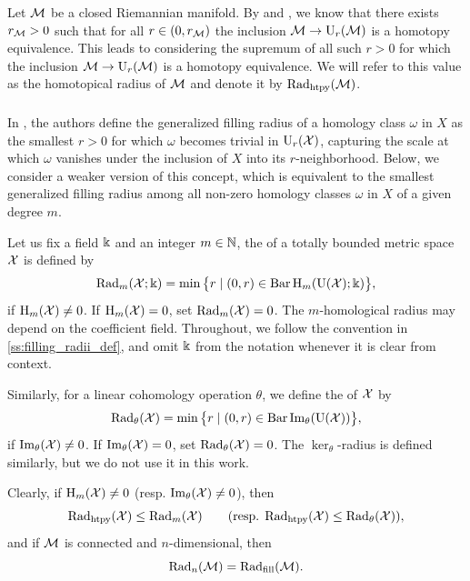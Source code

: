 Let \(\mathcal{M}\) be a closed Riemannian manifold.
By \cite[Theorem~3.5]{hausmann1995vietoris} and \cite[Theorem~4.1]{lim2024vietoris}, we know that there exists \(r_{\mathcal{M}} > 0\) such that for all \(r \in (0, r_{\mathcal{M}})\) the inclusion \(\mathcal{M} \to \mathrm{U}_{r}(\mathcal{M})\) is a homotopy equivalence.
This leads to considering the supremum of all such \(r > 0\) for which the inclusion \(\mathcal{M} \to \mathrm{U}_r(\mathcal{M})\) is a homotopy
equivalence.
We will refer to this value as the homotopical radius of $\mathcal{M}$ and denote it by \(\mathrm{Rad}_{\mathrm{htpy}}(\mathcal{M})\).

\subsubsection{} \label{ss:beta v.s. fillrad}

In \cite[Definition~9.44]{lim2024vietoris}, the authors define the generalized filling radius of a homology class \(\omega\) in \(X\) as the smallest \(r > 0\) for which \(\omega\) becomes trivial in \(\mathrm{U}_r(\mathcal{X})\), capturing the scale at which \(\omega\) vanishes under the inclusion of \(X\) into its \(r\)-neighborhood.
Below, we consider a weaker version of this concept, which is equivalent to the smallest generalized filling radius among all non-zero homology classes \(\omega\) in \(X\) of a given degree $m$.

Let us fix a field \(\Bbbk\) and an integer \(m \in \mathbb{N}\), the  of a totally bounded metric space \(\mathcal{X}\) is defined by
\[
\mathrm{Rad}_{m}(\mathcal{X}; \Bbbk) =
\min \big\{r \mid (0, r) \in \operatorname{Bar} \mathrm{H}_m(\mathrm{U}(\mathcal{X}); \Bbbk)\big\},
\]
if \(\mathrm{H}_m(\mathcal{X}) \neq 0\).
If \(\mathrm{H}_m(\mathcal{X}) = 0\), set \(\mathrm{Rad}_{m}(\mathcal{X}) = 0\).
The \(m\)-homological radius may depend on the coefficient field.
Throughout, we follow the convention in \cref{ss:filling_radii_def}, and omit \(\Bbbk\) from the notation whenever it is clear from context.

Similarly, for a linear cohomology operation \(\theta\), we define the  of \(\mathcal{X}\) by
\[
\mathrm{Rad}_{\theta}(\mathcal{X}) = \min \big\{r \mid (0, r) \in \operatorname{Bar} \operatorname{Im}_\theta(\mathrm{U}(\mathcal{X}))\big\},
\]
if \(\operatorname{Im}_\theta(\mathcal{X}) \neq 0\).
If \(\operatorname{Im}_\theta(\mathcal{X}) = 0\), set $\mathrm{Rad}_{\theta}(\mathcal{X}) = 0$.
The \(\ker_\theta\)-radius is defined similarly, but we do not use it in this work.

Clearly, if \(\mathrm{H}_m(\mathcal{X}) \neq 0\) (resp. \(\operatorname{Im}_\theta(\mathcal{X}) \neq 0\)), then
\[
\mathrm{Rad}_{\mathrm{htpy}}(\mathcal{X}) \leq \mathrm{Rad}_{m}(\mathcal{X}) \qquad (\text{resp. }\mathrm{Rad}_{\mathrm{htpy}}(\mathcal{X}) \leq \mathrm{Rad}_{\theta}(\mathcal{X})),
\]
and if $\mathcal{M}$ is connected and $n$-dimensional, then
\[
\mathrm{Rad}_{n}(\mathcal{M}) = \mathrm{Rad}_{\mathrm{fill}}(\mathcal{M}).
\]

